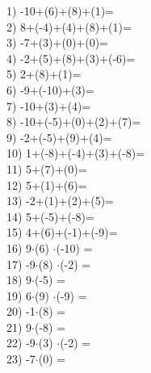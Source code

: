 \documentclass[a4paper,10pt]{article}
\begin{document}
1)   -10+(6)+(8)+(1)=
\vspace{0.5cm}\\2)   8+(-4)+(4)+(8)+(1)=
\vspace{0.5cm}\\3)   -7+(3)+(0)+(0)=
\vspace{0.5cm}\\4)   -2+(5)+(8)+(3)+(-6)=
\vspace{0.5cm}\\5)   2+(8)+(1)=
\vspace{0.5cm}\\6)   -9+(-10)+(3)=
\vspace{0.5cm}\\7)   -10+(3)+(4)=
\vspace{0.5cm}\\8)   -10+(-5)+(0)+(2)+(7)=
\vspace{0.5cm}\\9)   -2+(-5)+(9)+(4)=
\vspace{0.5cm}\\10)   1+(-8)+(-4)+(3)+(-8)=
\vspace{0.5cm}\\11)   5+(7)+(0)=
\vspace{0.5cm}\\12)   5+(1)+(6)=
\vspace{0.5cm}\\13)   -2+(1)+(2)+(5)=
\vspace{0.5cm}\\14)   5+(-5)+(-8)=
\vspace{0.5cm}\\15)   4+(6)+(-1)+(-9)=
\vspace{0.5cm}\\16)   9$\cdot$(6) $\cdot$(-10) =
\vspace{0.5cm}\\17)   -9$\cdot$(8) $\cdot$(-2) =
\vspace{0.5cm}\\18)   9$\cdot$(-5) =
\vspace{0.5cm}\\19)   6$\cdot$(9) $\cdot$(-9) =
\vspace{0.5cm}\\20)   -1$\cdot$(8) =
\vspace{0.5cm}\\21)   9$\cdot$(-8) =
\vspace{0.5cm}\\22)   -9$\cdot$(3) $\cdot$(-2) =
\vspace{0.5cm}\\23)   -7$\cdot$(0) =
\end{document}
